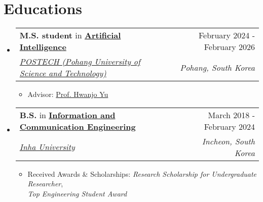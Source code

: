 \documentclass[letterpaper,11pt]{article}
\makeatletter
\newcommand{\resumeSubheading}[4]{
  \vspace{-1pt}\item
    \begin{tabular*}{0.97\textwidth}{l@{\extracolsep{\fill}}r}
      #1 & #2 \\
      \textit{\small#3} & \textit{\small #4} \\
    \end{tabular*}\vspace{-5pt}
}
\makeatother
\begin{document}
    \section{Educations}
    \begin{itemize}[leftmargin=*,label=]
        \resumeSubheading
        {\textbf{M.S. student} in \textbf{\href{https://ai.postech.ac.kr/}{Artificial Intelligence}\textbf{}}}{February 2024 - February 2026}{\href{https://www.postech.ac.kr/eng/}{POSTECH (Pohang University of Science and Technology)}}{Pohang, South Korea}
            \begin{itemize}[label=\bullet]
                \item{Advisor: \href{https://sites.google.com/view/postechdi/member/faculty?authuser=0}{Prof. Hwanjo Yu}}
            \end{itemize}
            
        \resumeSubheading
        {\textbf{B.S.} in \textbf{\href{http://bit.ly/3Uu4LTi}{Information and Communication Engineering}}}{March 2018 - February 2024}{\href{https://eng.inha.ac.kr/eng/index.do}{Inha University}}{Incheon, South Korea}
            \begin{itemize}[label=\bullet]
                \item{Received Awards \& Scholarships: \textit{Research Scholarship for Undergraduate Researcher}, \\ \textit{Top Engineering Student Award}}
            \end{itemize}

    \end{itemize}

    
\end{document}
